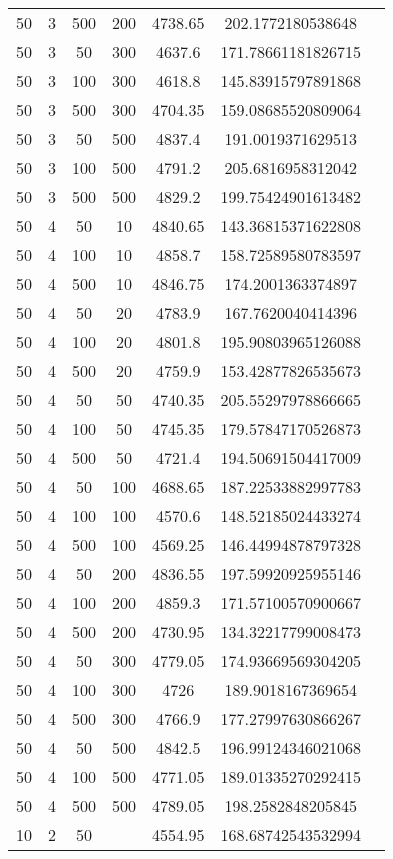 {\begin{longtabu}{S
S
S
S
S
S[round-mode=places, round-precision=0]
S[round-mode=places, round-precision=0]}
50 & 3 & 500 & 200 & 4738.65 & 202.1772180538648 \\
50 & 3 & 50 & 300 & 4637.6 & 171.78661181826715 \\
50 & 3 & 100 & 300 & 4618.8 & 145.83915797891868 \\
50 & 3 & 500 & 300 & 4704.35 & 159.08685520809064 \\
50 & 3 & 50 & 500 & 4837.4 & 191.0019371629513 \\
50 & 3 & 100 & 500 & 4791.2 & 205.6816958312042 \\
50 & 3 & 500 & 500 & 4829.2 & 199.75424901613482 \\
50 & 4 & 50 & 10 & 4840.65 & 143.36815371622808 \\
50 & 4 & 100 & 10 & 4858.7 & 158.72589580783597 \\
50 & 4 & 500 & 10 & 4846.75 & 174.2001363374897 \\
50 & 4 & 50 & 20 & 4783.9 & 167.7620040414396 \\
50 & 4 & 100 & 20 & 4801.8 & 195.90803965126088 \\
50 & 4 & 500 & 20 & 4759.9 & 153.42877826535673 \\
50 & 4 & 50 & 50 & 4740.35 & 205.55297978866665 \\
50 & 4 & 100 & 50 & 4745.35 & 179.57847170526873 \\
50 & 4 & 500 & 50 & 4721.4 & 194.50691504417009 \\
50 & 4 & 50 & 100 & 4688.65 & 187.22533882997783 \\
50 & 4 & 100 & 100 & 4570.6 & 148.52185024433274 \\
50 & 4 & 500 & 100 & 4569.25 & 146.44994878797328 \\
50 & 4 & 50 & 200 & 4836.55 & 197.59920925955146 \\
50 & 4 & 100 & 200 & 4859.3 & 171.57100570900667 \\
50 & 4 & 500 & 200 & 4730.95 & 134.32217799008473 \\
50 & 4 & 50 & 300 & 4779.05 & 174.93669569304205 \\
50 & 4 & 100 & 300 & 4726 & 189.9018167369654 \\
50 & 4 & 500 & 300 & 4766.9 & 177.27997630866267 \\
50 & 4 & 50 & 500 & 4842.5 & 196.99124346021068 \\
50 & 4 & 100 & 500 & 4771.05 & 189.01335270292415 \\
50 & 4 & 500 & 500 & 4789.05 & 198.2582848205845 \\
10 & 2 & 50 & & 4554.95 & 168.68742543532994 \\

\end{longtabu}}
